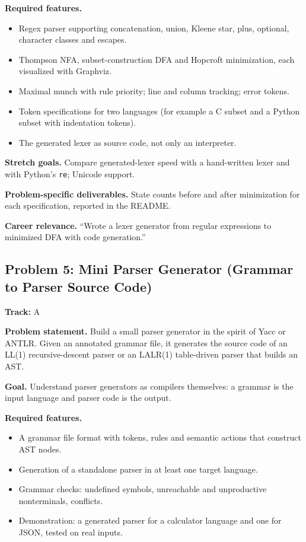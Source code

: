 \documentclass[11pt,a4paper]{article}
\newcommand{\fld}[1]{\par\smallskip\textbf{\color{accent}#1}\quad}
\newcommand{\meta}[1]{%
  \begin{tcolorbox}[colback=softbg,colframe=softbg,boxsep=2pt,left=4pt,right=4pt,top=2pt,bottom=2pt,arc=2pt]
  \small\textbf{Track:} #1
  \end{tcolorbox}}
\begin{document}
\fld{Required features.}
\begin{itemize}
  \item Regex parser supporting concatenation, union, Kleene star, plus, optional, character classes and escapes.
  \item Thompson NFA, subset-construction DFA and Hopcroft minimization, each visualized with Graphviz.
  \item Maximal munch with rule priority; line and column tracking; error tokens.
  \item Token specifications for two languages (for example a C subset and a Python subset with indentation tokens).
  \item The generated lexer as source code, not only an interpreter.
\end{itemize}

\fld{Stretch goals.} Compare generated-lexer speed with a hand-written lexer and with Python's
\texttt{re}; Unicode support.

\fld{Problem-specific deliverables.} State counts before and after minimization for each specification, reported in the README.

\fld{Career relevance.} ``Wrote a lexer generator from regular expressions to minimized DFA with code generation.''

\subsection{Problem 5: Mini Parser Generator (Grammar to Parser Source Code)}
\meta{A}

\fld{Problem statement.} Build a small parser generator in the spirit of Yacc or ANTLR. Given an
annotated grammar file, it generates the source code of an LL(1) recursive-descent parser or an
LALR(1) table-driven parser that builds an AST.

\fld{Goal.} Understand parser generators as compilers themselves: a grammar is the input language and
parser code is the output.

\fld{Required features.}
\begin{itemize}
  \item A grammar file format with tokens, rules and semantic actions that construct AST nodes.
  \item Generation of a standalone parser in at least one target language.
  \item Grammar checks: undefined symbols, unreachable and unproductive nonterminals, conflicts.
  \item Demonstration: a generated parser for a calculator language and one for JSON, tested on real inputs.
\end{itemize}
\end{document}
